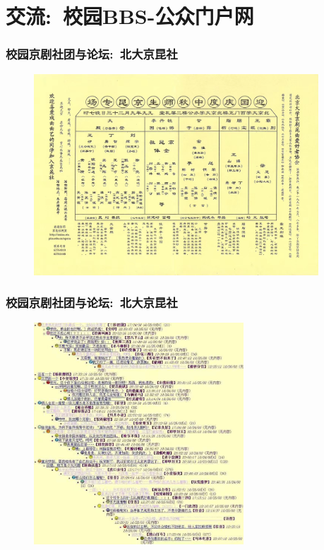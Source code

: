 \documentclass[cjk,slidestop,compress,mathserif,blue]{beamer}
\begin{document}
\small
\section{交流:~校园\rm{BBS}-公众门户网}
\frame
{
	\frametitle{校园京剧社团与论坛:~北大京昆社}
\begin{figure}[h!]
\centering
\vspace{-0.1in}
\includegraphics[height=0.70\textwidth,width=0.95\textwidth,clip]{Figures/PekOpe_PKU-1.jpg}
\label{PKU-1}
\end{figure}
}

\frame
{
	\frametitle{校园京剧社团与论坛:~北大京昆社}
\begin{figure}[h!]
\centering
\vspace{-0.2in}
\includegraphics[height=0.75\textwidth,width=0.70\textwidth,clip]{Figures/PekOpe_PKU-2.jpg}
\label{PKU-2}
\end{figure}
}
\end{document}

